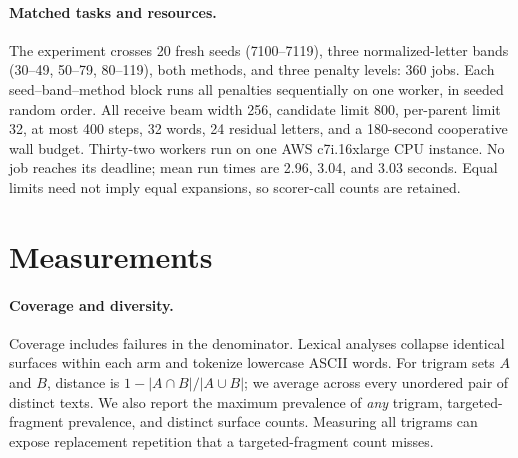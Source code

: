 \documentclass[11pt]{article}
\begin{document}
\paragraph{Matched tasks and resources.}
The experiment crosses 20 fresh seeds (7100--7119), three normalized-letter bands (30--49, 50--79, 80--119), both methods, and three penalty levels: 360 jobs. Each seed--band--method block runs all penalties sequentially on one worker, in seeded random order. All receive beam width 256, candidate limit 800, per-parent limit 32, at most 400 steps, 32 words, 24 residual letters, and a 180-second cooperative wall budget. Thirty-two workers run on one AWS c7i.16xlarge CPU instance. No job reaches its deadline; mean run times are 2.96, 3.04, and 3.03 seconds. Equal limits need not imply equal expansions, so scorer-call counts are retained.

\section{Measurements}
\paragraph{Coverage and diversity.}
Coverage includes failures in the denominator. Lexical analyses collapse identical surfaces within each arm and tokenize lowercase ASCII words. For trigram sets $A$ and $B$, distance is $1-|A\cap B|/|A\cup B|$; we average across every unordered pair of distinct texts. We also report the maximum prevalence of \emph{any} trigram, targeted-fragment prevalence, and distinct surface counts. Measuring all trigrams can expose replacement repetition that a targeted-fragment count misses.
\end{document}
